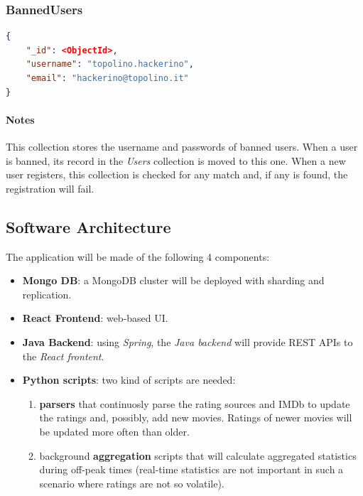 \documentclass[11pt]{article}
\begin{document}
\subsubsection{BannedUsers}
\label{sec:banned_users}

\begin{lstlisting}[language=json]	
{
	"_id": <ObjectId>,
	"username": "topolino.hackerino",
	"email": "hackerino@topolino.it"
}
\end{lstlisting}

\paragraph{Notes}
This collection stores the username and passwords of banned users. 
When a user is banned, its record in the \emph{Users} collection is moved
to this one.
When a new user registers, this collection is checked for any match and, 
if any is found, the registration will fail. 


\subsection{Software Architecture}

The application will be made of the following 4 components:
\begin{itemize}
	\item \textbf{Mongo DB}: a MongoDB cluster will be deployed with sharding and replication.
	\item \textbf{React Frontend}: web-based UI.
	\item \textbf{Java Backend}: using \emph{Spring}, the \emph{Java backend} will provide REST APIs to the \emph{React frontent}.
	\item \textbf{Python scripts}: two kind of scripts are needed: 
	\begin{enumerate}
		\item \textbf{parsers} that continuosly parse the rating sources and IMDb to update the ratings and, possibly, add new movies. Ratings of newer movies will be updated more often than older.
		\item background \textbf{aggregation} scripts that will calculate aggregated statistics during off-peak times (real-time statistics are not important in such a scenario where ratings are not so volatile).
	\end{enumerate}
\end{itemize}

\end{document}
